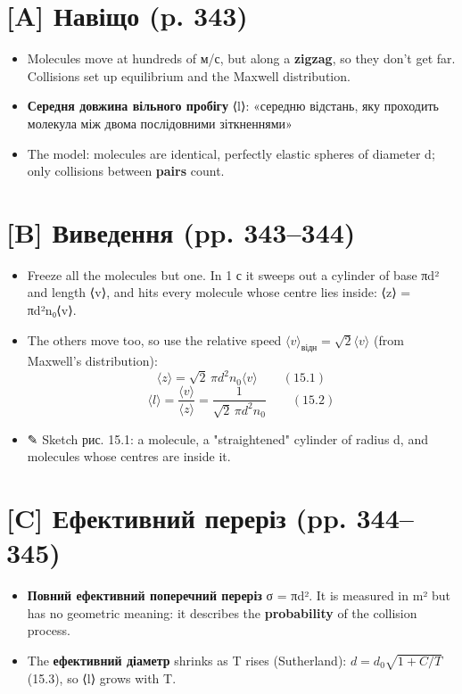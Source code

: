 \documentclass[11pt,a4paper,oneside]{book}
\newcommand{\pen}{{\sffamily\color{accent}✎}}
\begin{document}
\section*{[A] Навіщо (p. 343)}
\begin{itemize}
\item Molecules move at hundreds of м/с, but along a \textbf{zigzag}, so they don't get far. Collisions set up equilibrium and the Maxwell distribution.
\item \textbf{Середня довжина вільного пробігу} ⟨l⟩: «середню відстань, яку проходить молекула між двома послідовними зіткненнями»
\item The model: molecules are identical, perfectly elastic spheres of diameter d; only collisions between \textbf{pairs} count.
\end{itemize}

\section*{[B] Виведення (pp. 343–344)}
\begin{itemize}
\item Freeze all the molecules but one. In 1 с it sweeps out a cylinder of base πd² and length ⟨v⟩, and hits every molecule whose centre lies inside: ⟨z⟩ = πd²n₀⟨v⟩.
\item The others move too, so use the relative speed $\langle v\rangle_{\text{відн}} = \sqrt2\langle v\rangle$ (from Maxwell's distribution):
\[\langle z\rangle = \sqrt2\,\pi d^2n_0\langle v\rangle\qquad(15.1)\]
\[\langle l\rangle = \frac{\langle v\rangle}{\langle z\rangle} = \frac{1}{\sqrt2\,\pi d^2n_0}\qquad(15.2)\]
\item \pen{} Sketch рис. 15.1: a molecule, a "straightened" cylinder of radius d, and molecules whose centres are inside it.
\end{itemize}

\section*{[C] Ефективний переріз (pp. 344–345)}
\begin{itemize}
\item \textbf{Повний ефективний поперечний переріз} σ = πd². It is measured in m² but has no geometric meaning: it describes the \textbf{probability} of the collision process.
\item The \textbf{ефективний діаметр} shrinks as T rises (Sutherland): $d = d_0\sqrt{1 + C/T}$ (15.3), so ⟨l⟩ grows with T.
\end{itemize}
\end{document}
